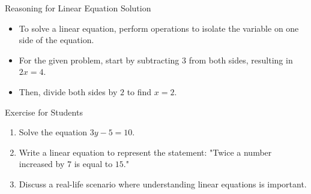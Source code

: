 \begin{frame}{Reasoning for Linear Equation Solution}
  \begin{itemize}
    \item To solve a linear equation, perform operations to isolate the variable on one side of the equation.
    \item For the given problem, start by subtracting $3$ from both sides, resulting in $2x = 4$.
    \item Then, divide both sides by $2$ to find $x = 2$.
  \end{itemize}
\end{frame}

\begin{frame}{Exercise for Students}
  \begin{enumerate}
    \item Solve the equation $3y - 5 = 10$.
    \item Write a linear equation to represent the statement: "Twice a number increased by $7$ is equal to $15$."
    \item Discuss a real-life scenario where understanding linear equations is important.
  \end{enumerate}
\end{frame}

